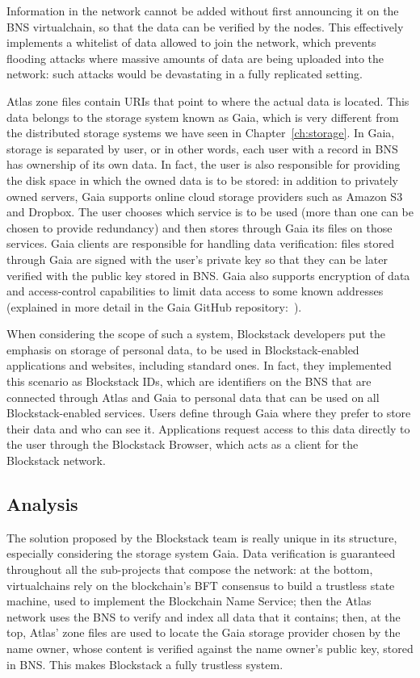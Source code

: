 \documentclass[mscthesis]{usiinfthesis}
\begin{document}
Information in the network cannot be added without first announcing it on the BNS virtualchain, so that the data can be verified by the nodes. This effectively implements a whitelist of data allowed to join the network, which prevents flooding attacks where massive amounts of data are being uploaded into the network: such attacks would be devastating in a fully replicated setting.

Atlas zone files contain URIs that point to where the actual data is located. This data belongs to the storage system known as Gaia, which is very different from the distributed storage systems we have seen in Chapter~\ref{ch:storage}. In Gaia, storage is separated by user, or in other words, each user with a record in BNS has ownership of its own data. In fact, the user is also responsible for providing the disk space in which the owned data is to be stored: in addition to privately owned servers, Gaia supports online cloud storage providers such as Amazon S3 and Dropbox. The user chooses which service is to be used (more than one can be chosen to provide redundancy) and then stores through Gaia its files on those services. Gaia clients are responsible for handling data verification: files stored through Gaia are signed with the user's private key so that they can be later verified with the public key stored in BNS. Gaia also supports encryption of data and access-control capabilities to limit data access to some known addresses (explained in more detail in the Gaia GitHub repository:~\cite{website:gaiaaccesscontrol}).

When considering the scope of such a system, Blockstack developers put the emphasis on storage of personal data, to be used in Blockstack-enabled applications and websites, including standard ones.
In fact, they implemented this scenario as Blockstack IDs, which are identifiers on the BNS that are connected through Atlas and Gaia to personal data that can be used on all Blockstack-enabled services.
Users define through Gaia where they prefer to store their data and  who can see it. Applications request access to this data directly to the user through the Blockstack Browser, which acts as a client for the Blockstack network.

\subsection{Analysis}

The solution proposed by the Blockstack team is really unique in its structure, especially considering the storage system Gaia. Data verification is guaranteed throughout all the sub-projects that compose the network: at the bottom, virtualchains rely on the blockchain's BFT consensus to build a trustless state machine, used to implement the Blockchain Name Service; then the Atlas network uses the BNS to verify and index all data that it contains; then, at the top, Atlas' zone files are used to locate the Gaia storage provider chosen by the name owner, whose content is verified against the name owner's public key, stored in BNS. This makes Blockstack a fully trustless system.
\end{document}
